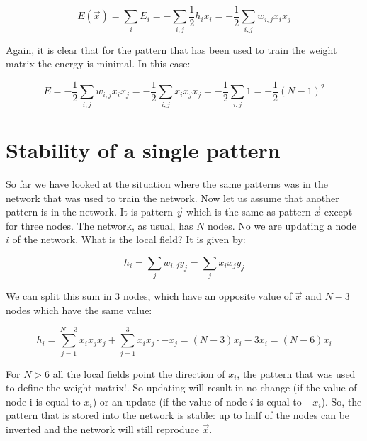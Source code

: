 \[
E(\vec{x}) = \sum_i E_i = - \sum_{i,j}\frac{1}{2}h_ix_i = -\frac{1}{2}\sum_{i,j}w_{i,j}x_ix_j
\]

Again, it is clear that for the pattern that has been used to train the weight
matrix the energy is minimal. In this case:

\[
E = -\frac{1}{2} \sum_{i,j}w_{i,j}x_ix_j = -\frac{1}{2} \sum_{i,j}x_ix_jx_j = -\frac{1}{2}
\sum_{i,j}1 = -\frac{1}{2}(N-1)^2
\]
\section{Stability of a single pattern}
So far we have looked at the situation where the same patterns was in the
network that was used to train the network. Now let us assume that another
pattern is in the network. It is pattern $\vec{y}$ which is the same as pattern $\vec{x}$ except for three nodes. The network, as usual, has $N$ nodes. No we are updating a
node $i$ of the network. What is the local field? It is given by:

\[
h_i = \sum_j w_{i,j}y_j = \sum_j x_ix_jy_j 
\]

We can split this sum in 3 nodes, which have an opposite value of $\vec{x}$ and
$N − 3$ nodes which have the same value:

\[
h_i = \sum^{N-3}_{j=1} x_ix_jx_j + \sum^3_{j=1} x_ix_j · -x_j = (N - 3)x_i - 3x_i = (N - 6)x_i
\]

For $N > 6$ all the local fields point the direction of $x_i$, the pattern that was
used to define the weight matrix!. So updating will result in no change (if the
value of node i is equal to $x_i$) or an update (if the value of node $i$ is equal to
$-x_i$). So, the pattern that is stored into the network is stable: up to half of the
nodes can be inverted and the network will still reproduce $\vec{x}$.

%

